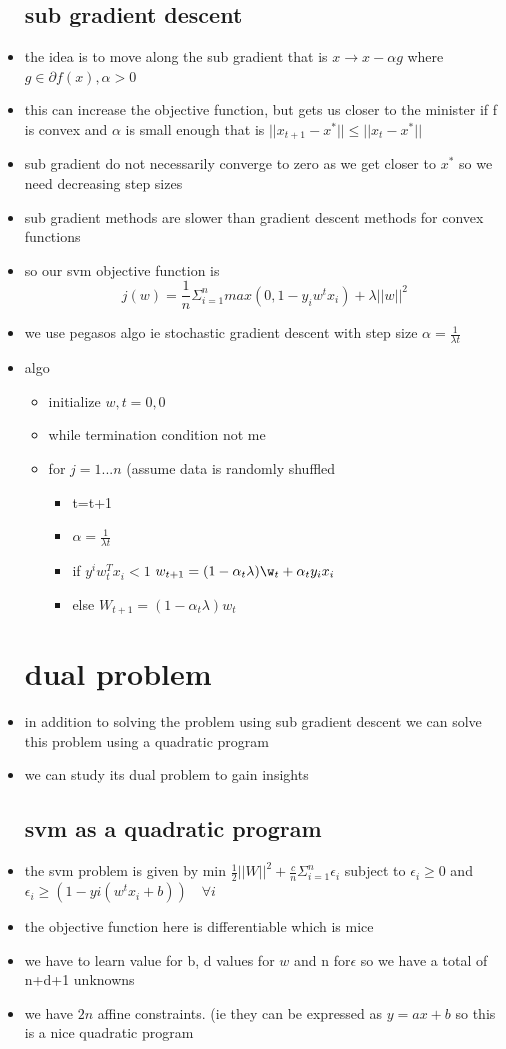 \documentclass{article}
\begin{document}
\begin{itemize}
\subsection{sub gradient descent}
\item the idea is to move along the sub gradient that is $x\rightarrow x-\alpha g$ where $g\in\partial f(x), \alpha>0$
\item this can increase the objective function, but gets us closer to the minister if f is convex and $\alpha$ is small enough that is $||x_{t+1}-x^{*}||\leq ||x_{t}-x^{*}||$
\item sub gradient do not necessarily converge to zero as we get closer to $x^{*}$ so we need decreasing step sizes 
\item sub gradient methods are slower than gradient descent methods for convex functions 
\item so our svm objective function is $$j(w)=\frac{1}{n}\Sigma_{i=1}^{n}max(0,1-y_iw^{t}x_i)+\lambda||w||^{2}$$
\item we use pegasos algo ie stochastic gradient descent with step size $\alpha=\frac{1}{\lambda t}$
\item algo
\begin{itemize}
    \item initialize $w,t=0,0$
    \item while termination condition not me 
    \item for $j=1...n $ (assume data is randomly shuffled
    \begin{itemize}
        \item t=t+1
        \item $\alpha=\frac{1}{\lambda t}$
        \item if $y^{i}w_{t}^{T}x_i< 1$ $w_{t+1}=(1-\alpha_{t}\lambda)\w_{t}+\alpha_{t}y_{i}x_{i}$
        \item else $W_{t+1}=(1-\alpha_{t}\lambda)w_{t}$
    \end{itemize}
\end{itemize}
\section{dual problem}
\item in addition to solving the problem using sub gradient descent we can solve this problem using a quadratic program 
\item we can study its dual problem to gain insights
\subsection{svm as a quadratic program}
\item the svm problem is given by min $\frac{1}{2}||W||^{2}+\frac{c}{n}\Sigma_{i=1}^{n}\epsilon_{i}$ subject to $\epsilon_{i}\geq 0$ and $\epsilon_{i}\geq (1-yi(w^{t}x_i+b))\quad \forall i$
\item the objective function here is differentiable which is mice
\item we have to learn value for b, d values for $w$ and n for$ \epsilon$ so we have a total of n+d+1 unknowns
\item we have $2n$ affine constraints. (ie they can be expressed as $y=ax+b$
\itme so this is a nice quadratic program 

\end{itemize}
\end{document}

